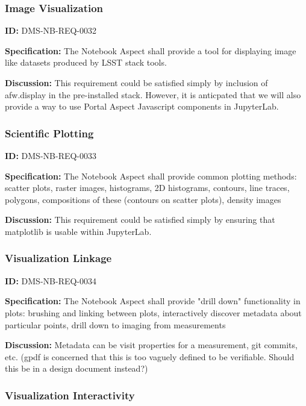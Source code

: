 \documentclass[SE,toc,lsstdraft]{lsstdoc}
\begin{document}
\subsubsection{Image Visualization}

\label{DMS-NB-REQ-0032}
\textbf{ID:} DMS-NB-REQ-0032

\textbf{Specification:}
The Notebook Aspect shall provide a tool for displaying image like datasets produced by LSST stack tools.

\textbf{Discussion:}
This requirement could be satisfied simply by inclusion of afw.display in the pre-installed stack.  However, it is anticpated that we will also provide a way to use Portal Aspect Javascript components in JupyterLab.

\subsubsection{Scientific Plotting}

\label{DMS-NB-REQ-0033}
\textbf{ID:} DMS-NB-REQ-0033

\textbf{Specification:}
The Notebook Aspect shall provide common plotting methods:
scatter plots, raster images, histograms, 2D histograms, contours, line traces, polygons, compositions of these (contours on scatter plots), density images

\textbf{Discussion:}
This requirement could be satisfied simply by ensuring that matplotlib is usable within JupyterLab.

\subsubsection{Visualization Linkage}

\label{DMS-NB-REQ-0034}
\textbf{ID:} DMS-NB-REQ-0034

\textbf{Specification:}
The Notebook Aspect shall provide "drill down" functionality in plots: brushing and linking between plots, interactively discover metadata about particular points, drill down to imaging from measurements

\textbf{Discussion:}
Metadata can be visit properties for a measurement, git commits, etc. (gpdf is concerned that this is too vaguely defined to be verifiable.  Should this be in a design document instead?)

\subsubsection{Visualization Interactivity}
\end{document}
